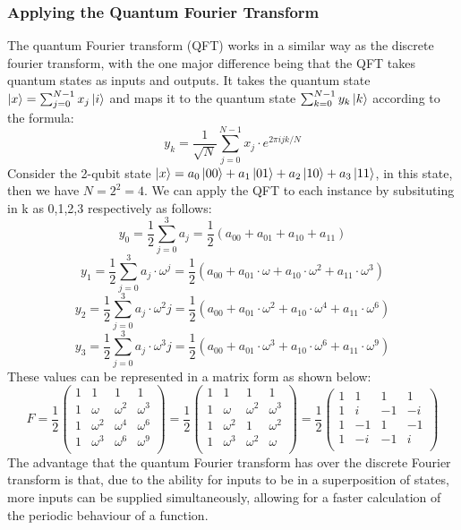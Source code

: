 \subsubsection{Applying the Quantum Fourier Transform}
The quantum Fourier transform (QFT) works in a similar way as the discrete fourier transform, with the one major difference being that the QFT takes quantum states as inputs and outputs. It takes the quantum state $\ket{x} = \sum_{j=0}^{N-1}x_j\ket{i}$ and maps it to the quantum state  $\sum_{k=0}^{N-1}y_k\ket{k}$ according to the formula:
$$y_k = \frac{1}{\sqrt{N}}\sum_{j=0}^{N-1}x_j\cdot{e^{2\pi ijk/N}}$$
Consider the 2-qubit state $\ket{x} = a_0\ket{00} + a_1\ket{01} + a_2\ket{10} + a_3\ket{11}$, in this state, then we have $N = 2^2 = 4$. We can apply the QFT to each instance by subsituting in k as 0,1,2,3 respectively as follows:
$$y_0 = \frac{1}{2}\sum_{j=0}^{3}a_j=\frac{1}{2}(a_{00}+a_{01}+a_{10}+a_{11})$$
$$y_1 = \frac{1}{2}\sum_{j=0}^{3}a_j\cdot{\omega^j}=\frac{1}{2}(a_{00}+a_{01}\cdot{\omega}+a_{10}\cdot{\omega^2}+a_{11}\cdot{\omega^3})$$
$$y_2 = \frac{1}{2}\sum_{j=0}^{3}a_j\cdot{\omega^2j}=\frac{1}{2}(a_{00}+a_{01}\cdot{\omega^2}+a_{10}\cdot{\omega^4}+a_{11}\cdot{\omega^6})$$
$$y_3 = \frac{1}{2}\sum_{j=0}^{3}a_j\cdot{\omega^3j}=\frac{1}{2}(a_{00}+a_{01}\cdot{\omega^3}+a_{10}\cdot{\omega^6}+a_{11}\cdot{\omega^9})$$
These values can be represented in a matrix form as shown below:
$$F = \frac{1}{2}
\begin{pmatrix} 
1 & 1 & 1 & 1 \\
1 & \omega & \omega^2 & \omega^3 \\
1 & \omega^2 & \omega^4 & \omega^6 \\
1 & \omega^3 & \omega^6 & \omega^9 \\
\end{pmatrix} = \frac{1}{2} 
\begin{pmatrix}
1 & 1 & 1 & 1 \\
1 & \omega & \omega^2 & \omega^3 \\
1 & \omega^2 & 1 & \omega^2 \\
1 & \omega^3 & \omega^2 & \omega \\
\end{pmatrix} = \frac{1}{2} 
\begin{pmatrix}
1 & 1 & 1 & 1 \\
1 & i & -1 & -i \\
1 & -1 & 1 & -1 \\
1 & -i & -1 & i \\
\end{pmatrix}
$$
The advantage that the quantum Fourier transform has over the discrete Fourier transform is that, due to the ability for inputs to be in a superposition of states, more inputs can be supplied simultaneously, allowing for a faster calculation of the periodic behaviour of a function.
